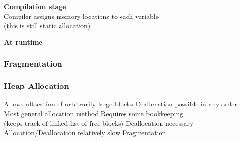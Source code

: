 \documentclass{ucll-slides}
\begin{document}
\begin{frame}
\begin{columns}
\begin{center}
    \end{center}
  \end{columns}
  \vskip2cm
  \begin{overprint}
    \begin{center}
      \textbf{Compilation stage} \\ Compiler assigns memory locations to each variable \\ (this is still static allocation)
    \end{center}

    \begin{center}
      \textbf{At runtime}
    \end{center}
  \end{overprint}
\end{frame}

\begin{frame}
  \frametitle{Fragmentation}
  \begin{center}
  \end{center}
\end{frame}

\begin{frame}
  \frametitle{Heap Allocation}
  \begin{procontralist}
    \pro Allows allocation of arbitrarily large blocks
    \pro Deallocation possible in any order
    \pro Most general allocation method
    \con Requires some bookkeeping \\ (keeps track of linked list of free blocks)
    \con Deallocation necessary
    \con Allocation/Deallocation relatively slow
    \con Fragmentation
  \end{procontralist}
\end{frame}
\end{document}

